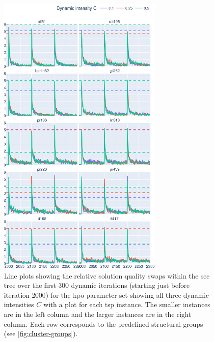 \begin{figure}[p]
	\centering
	\includegraphics[width=0.725\textwidth]{results/part3/run_plot_cmp_dynamic_aggr_problem_y_swaps_1_to_30_HPO.svg}
	\caption[Line plots showing the swaps within the \gls{sce} tree over dynamic iterations for the \gls{hpo} parameter set showing all three dynamic intensities $C$ with a plot for each \gls{tsp} instance.]{Line plots showing the relative solution quality swaps within the \gls{sce} tree over the first 300 dynamic iterations (starting just before iteration 2000) for the \gls{hpo} parameter set showing all three dynamic intensities $C$ with a plot for each \gls{tsp} instance. The smaller instances are in the left column and the larger instances are in the right column. Each row corresponds to the predefined structural groups (see \cref{fig:cluster-groups}).}
		\label{fig:run_plot_cmp_dynamic_aggr_problem_swaps_HPO}
	\end{figure}


